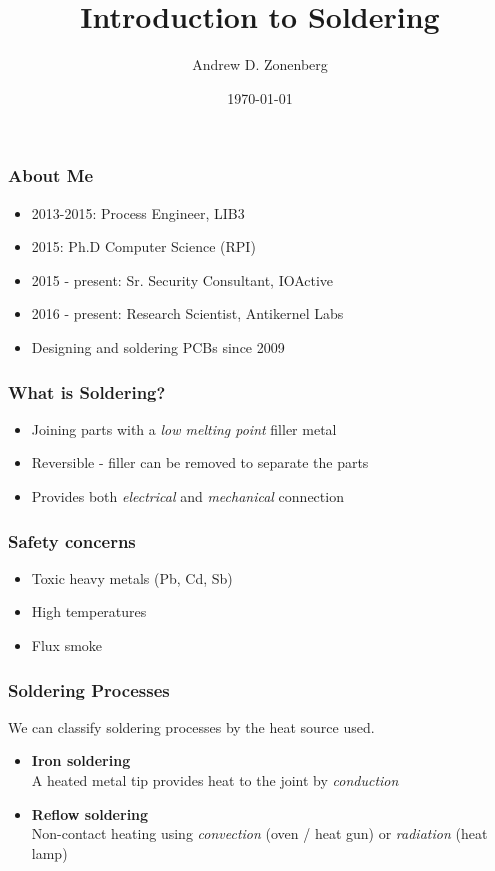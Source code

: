 \documentclass{beamer}
\title{Introduction to Soldering}
\author{Andrew D. Zonenberg}
\institute{Antikernel Labs}
\date{\today}
\begin{document}
\frame{\titlepage}

\begin{frame}
\frametitle{About Me}

\begin{itemize}
\item 2013-2015: Process Engineer, LIB3
\item 2015: Ph.D Computer Science (RPI)
\item 2015 - present: Sr. Security Consultant, IOActive
\item 2016 - present: Research Scientist, Antikernel Labs
\item Designing and soldering PCBs since 2009
\end{itemize}
\end{frame}

\begin{frame}
\frametitle{What is Soldering?}
\begin{itemize}
\item Joining parts with a \emph{low melting point} filler metal
\item Reversible - filler can be removed to separate the parts
\item Provides both \emph{electrical} and \emph{mechanical} connection
\end{itemize}
\end{frame}

\begin{frame}
\frametitle{Safety concerns}
\begin{itemize}
\item Toxic heavy metals (Pb, Cd, Sb)
\item High temperatures
\item Flux smoke
\end{itemize}
\end{frame}

\begin{frame}
\frametitle{Soldering Processes}
We can classify soldering processes by the heat source used.
\begin{itemize}
\item \textbf{Iron soldering} \\
A heated metal tip provides heat to the joint by \emph{conduction}
\item \textbf{Reflow soldering} \\
Non-contact heating using \emph{convection} (oven / heat gun) or \emph{radiation} (heat lamp)
\end{itemize}
\end{frame}
\end{document}
